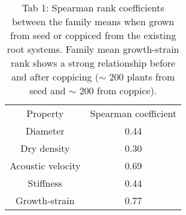 
\begin{table} 
\centering
    \begin{tabular}{ c c }
Property          & Spearman coefficient \\
Diameter          & 0.44                 \\
Dry density       & 0.30                 \\
Acoustic velocity & 0.69                 \\
Stiffness         & 0.44                 \\
Growth-strain     & 0.77  
    \end{tabular} 
    \caption{Tab 1: Spearman rank coefficients between the family means when grown from seed or coppiced from the existing root systems. Family mean growth-strain rank shows a strong relationship before and after coppicing (\(\sim\) 200 plants from seed and \(\sim\) 200 from coppice). } 
\end{table}